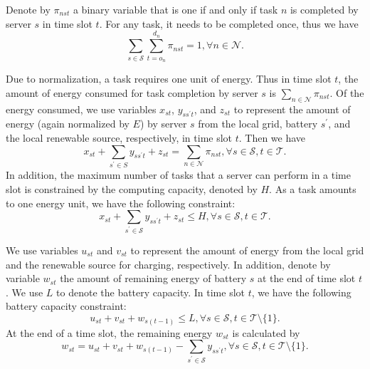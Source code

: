 \documentclass[conference, 10pt, ﬁnal, letterpaper, twocolumn]{IEEEtran}
\begin{document}
Denote by $\pi_{nst}$ a binary variable that is one if and only if task $n$ is completed by server $s$ in time slot $t$. For any task, it needs to be completed once, thus we have
\begin{equation}\label{Constraint_1}
    \sum_{s \in \mathcal{S}} \sum^{d_n}_{t = o_n} \pi_{nst} = 1, \forall n \in \mathcal{N}.
\end{equation}

Due to normalization, a task requires one unit of energy. Thus in time slot $t$, the amount of energy consumed for task completion by server $s$ is $\sum_{n \in \mathcal{N}} \pi_{nst}$. Of the energy consumed, we use variables $x_{st}$, $y_{ss^\prime t}$, and $z_{st}$ to represent the amount of energy (again normalized by $E$) by server $s$ from the local grid, battery $s^\prime$, and the local renewable source, respectively, in time slot $t$. Then we have
\begin{equation}\label{Constraint_2}
     x_{st} + \sum_{s^\prime \in S}  y _{ss^\prime t} + z_{st} = \sum_{n \in \mathcal{N}} \pi_{nst}, \forall s \in \mathcal{S}, t \in \mathcal{T}.
\end{equation}
In addition, the maximum number of tasks that a server can perform in a time slot is constrained by the computing capacity, denoted by $H$. As a task amounts to one energy unit, we have the following constraint:
\begin{equation}\label{Constraint_3}
    x_{st}+\sum_{s^\prime \in\mathcal{S}} y_{ss^\prime t} +z_{st} \leq H, \forall s \in \mathcal{S}, t \in \mathcal{T}.
\end{equation}

We use variables $u_{st}$ and $v_{st}$ to represent the amount of energy from the local grid and the renewable source for charging, respectively. In addition, denote by variable $w_{st}$ the amount of remaining energy of battery $s$ at the end of time slot $t$. We use $L$ to denote the battery capacity. In time slot $t$, we have the following battery capacity constraint:
\begin{equation}\label{Constraint_4}
    u_{st} + v_{st} + w_{s(t-1)} \leq L, \forall s \in \mathcal{S}, t \in \mathcal{T} \setminus \{1\}.
\end{equation}
At the end of a time slot, the remaining energy $w_{st}$ is calculated by
\begin{equation}\label{Constraint_5}
    w_{st} = u_{st} + v_{st} + w_{s(t-1)} -\sum_{s^\prime \in \mathcal{S}} y_{ss^\prime t}, \forall s \in \mathcal{S}, t \in \mathcal{T} \setminus \{1\}.
\end{equation}
\end{document}
